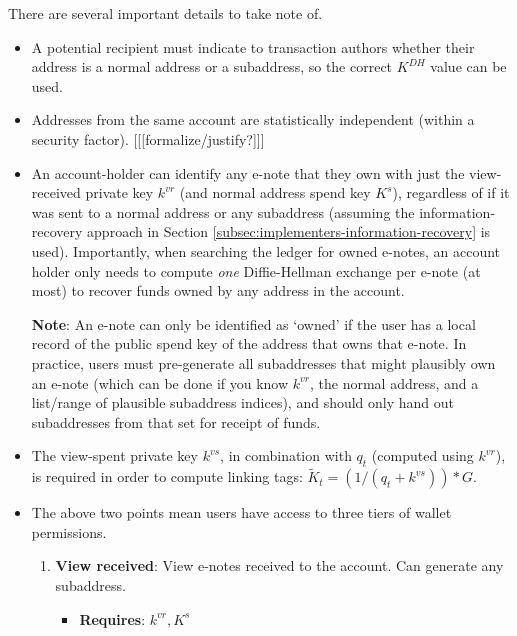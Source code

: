 There are several important details to take note of.

\begin{itemize}
    \item A potential recipient must indicate to transaction authors whether their address is a normal address or a subaddress, so the correct $K^{DH}$ value can be used.

    \item Addresses from the same account are statistically independent (within a security factor). [[[formalize/justify?]]]

    \item An account-holder can identify any e-note that they own with just the view-received private key $k^{vr}$ (and normal address spend key $K^s$), regardless of if it was sent to a normal address or any subaddress (assuming the information-recovery approach in Section \ref{subsec:implementers-information-recovery} is used). Importantly, when searching the ledger for owned e-notes, an account holder only needs to compute {\em one} Diffie-Hellman exchange per e-note (at most) to recover funds owned by any address in the account.

    \textbf{Note}: An e-note can only be identified as `owned' if the user has a local record of the public spend key of the address that owns that e-note. In practice, users must pre-generate all subaddresses that might plausibly own an e-note (which can be done if you know $k^{vr}$, the normal address, and a list/range of plausible subaddress indices), and should only hand out subaddresses from that set for receipt of funds.

    \item The view-spent private key $k^{vs}$, in combination with $q_t$ (computed using $k^{vr}$), is required in order to compute linking tags: $\tilde{K}_t = (1/(q_t + k^{vs}))*G$.

    \item The above two points mean users have access to three tiers of wallet permissions.

    \begin{enumerate}
        \item \textbf{View received}: View e-notes received to the account. Can generate any subaddress.
        \begin{itemize}
            \item \textbf{Requires}: $k^{vr}, K^s$
        \end{itemize}


\end{enumerate}
\end{itemize}
